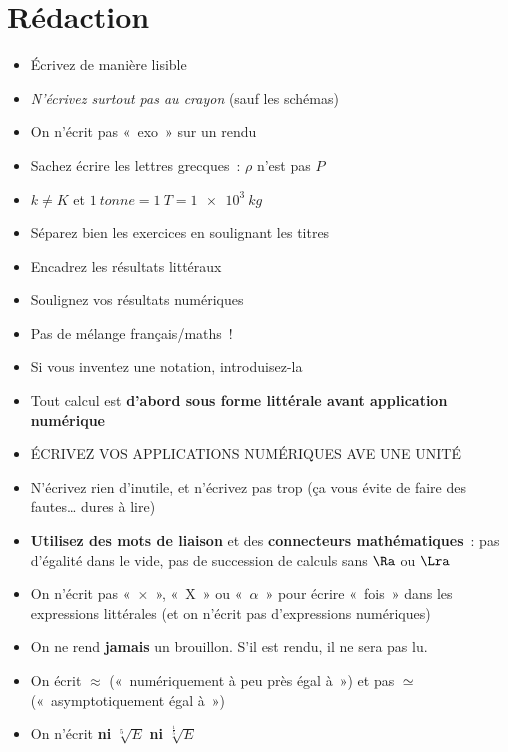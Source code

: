 \documentclass[a4paper, 12pt, final, garamond]{book}
\begin{document}
\section{Rédaction}
\begin{itemize}[label=$\diamond$, leftmargin=10pt]
	\item Écrivez de manière lisible
	\item \textit{N'écrivez surtout pas au crayon} (sauf les schémas)
	\item On n'écrit pas «~exo~» sur un rendu
	\item Sachez écrire les lettres grecques~: $\rho$ n'est pas $P$
	\item $k \neq K$ et $\SI{1}{tonne} = \SI{1}{T} = \SI{1e3}{kg}$
	\item Séparez bien les exercices en soulignant les titres
	\item Encadrez les résultats littéraux
	\item Soulignez vos résultats numériques
	\item Pas de mélange français/maths~!
	\item Si vous inventez une notation, introduisez-la
	\item Tout calcul est \textbf{d'abord sous forme littérale avant application
		      numérique}
	\item ÉCRIVEZ VOS APPLICATIONS NUMÉRIQUES AVE UNE UNITÉ
	\item N'écrivez rien d'inutile, et n'écrivez pas trop (ça vous évite de faire
	      des fautes… dures à lire)
	\item \textbf{Utilisez des mots de liaison} et des \textbf{connecteurs
		      mathématiques}~: pas d'égalité dans le vide, pas de succession de
	      calculs sans $\Ra $ ou $\Lra $
	\item On n'écrit pas «~$\times$~», «~X~» ou «~$\alpha$~» pour écrire «~fois~»
	      dans les expressions littérales (et on n'écrit pas d'expressions numériques)
	\item On ne rend \textbf{jamais} un brouillon. S'il est rendu, il ne sera
	      pas lu.
	\item On écrit $\approx$ («~numériquement à peu près égal à~») et pas $\simeq$
	      («~asymptotiquement égal à~»)
	\item On n'écrit \textbf{ni} $\sqrt[5]{E}$ \textbf{ni} $\sqrt[\frac{1}{5}]{E}$
\end{itemize}
\end{document}
